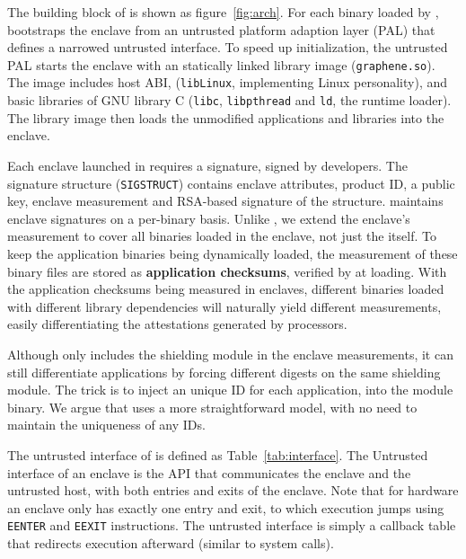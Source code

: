 The building block of \sysname{} is shown as figure~\ref{fig:arch}.
For each binary loaded by \sysname{}, \sysname{} bootstraps the enclave
from an untrusted platform adaption layer (PAL) that defines
a narrowed untrusted interface.
To speed up initialization, the untrusted PAL starts the enclave
with an statically linked library image ({\tt graphene.so}).
The image includes
\graphene{} host ABI,
\libos{} ({\tt libLinux}, implementing Linux personality),
and basic libraries of GNU library C
({\tt libc}, {\tt libpthread} and {\tt ld}, the runtime loader).
The \sysname{} library image then loads the unmodified applications
and libraries into the enclave.

Each enclave launched in \sgx{} requires a signature, signed by developers.
The signature structure ({\tt SIGSTRUCT}) contains
enclave attributes, product ID, a public key, enclave measurement
and RSA-based signature of the structure.
\sysname{} maintains enclave signatures on a per-binary basis.
Unlike \haven{}, we extend the enclave's measurement to
cover all binaries loaded in the enclave, not just the \libos{} itself.
To keep the application binaries being dynamically loaded,
the measurement of these binary files are stored as
{\bf application checksums}, verified by \sysname{} at loading.
With the application checksums being measured in enclaves,
different binaries loaded with different library dependencies
will naturally yield different measurements,
easily differentiating the attestations generated by processors.

Although \haven{} only includes the shielding module
in the enclave measurements,
it can still differentiate applications by forcing different digests
on the same shielding module.
The trick is to inject an unique ID for each application,
into the module binary.
We argue that \sysname{} uses a more straightforward model, with no need to
maintain the uniqueness of any IDs.

The untrusted interface of \sysname{} is defined as Table~\ref{tab:interface}.
The Untrusted interface of an enclave is the API that communicates the enclave
and the untrusted host, with both entries and exits of the enclave.
Note that for hardware an enclave only has exactly one entry and exit,
to which execution jumps
using {\tt EENTER} and {\tt EEXIT} instructions.
The untrusted interface is simply a callback table that redirects execution
afterward (similar to system calls).

